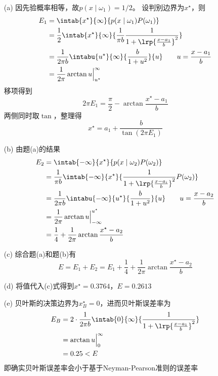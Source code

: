 \documentclass[reportComp]{thesis}
\begin{document}
\begin{answer}
\begin{itemize}
	\item [(a)] 因先验概率相等，故$p(x\mid\omega_1)=1/2$。
	设判别边界为$x^\star$，则
	\[\begin{aligned}
	E_1&=\intab{x^\star}{\infty}{p(x\mid\omega_1)P(\omega_1)}\\
	&=\frac{1}{2}\intab{x^\star}{\infty}{\frac{1}{\pi b}\frac{1}{1+\lrp{\frac{x-a_1}{b}}^2}}\\
	&=\frac{1}{2\pi b}\intabu{u^\star}{\infty}{\frac{b}{1+u^2}}{u}\qquad u=\frac{x-a_1}{b}\\
	&=\frac{1}{2\pi}\arctan u\Big|_{u^\star}^{\infty}
	\end{aligned}\]
	移项得到
	\[2\pi E_1=\frac{\pi}{2}-\arctan\frac{x^\star-a_1}{b}\]
	两侧同时取$\tan$，整理得
	\[x^\star=a_1+\frac{b}{\tan(2\pi E_1)}\]

	\item [(b)] 由题(a)的结果
	\[\begin{aligned}
	E_2&=\intab{-\infty}{x^\star}{p(x\mid\omega_2)P(\omega_2)}\\
	&=\frac{1}{\pi b}\intab{-\infty}{x^\star}{\frac{1}{1+\lrp{\frac{x-a_i}{b}}^2}P(\omega_2)}\\
	&=\frac{1}{2\pi b}\intabu{-\infty}{u^\star}{\frac{b}{1+u^2}}{u}\qquad u=\frac{x-a_2}{b}\\
	&=\frac{1}{2\pi}\arctan u\Big|_{-\infty}^{u^\star}\\
	&=\frac{1}{4}+\frac{1}{2\pi}\arctan\frac{x^\star-a_2}{b}
	\end{aligned}\]
	
	\item [(c)] 综合题(a)和题(b)有
	\[E=E_1+E_2=E_1+\frac{1}{4}+\frac{1}{2\pi}\arctan\frac{x^\star-a_2}{b}\]
	
	\item [(d)] 将值代入(c)式得到$x^\star=0.3764$，$E=0.2613$
	
	\item [(e)] 贝叶斯的决策边界为$x_B^\star=0$，进而贝叶斯误差率为
	\[\begin{aligned}
	E_B&=2\cdot\frac{1}{2\pi b}\intab{0}{\infty}{\frac{1}{1+\lrp{\frac{x-a_1}{b}}^2}}\\
	&=\arctan u\Big|_0^\infty\\
	&=0.25<E
	\end{aligned}\]
	即确实贝叶斯误差率会小于基于Neyman-Pearson准则的误差率
\end{itemize}
\end{answer}
\end{document}
